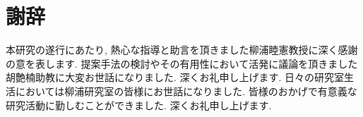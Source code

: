 \chapter*{謝辞}
本研究の遂行にあたり, 熱心な指導と助言を頂きました柳浦睦憲教授に深く感謝の意を表します.
提案手法の検討やその有用性において活発に議論を頂きました胡艶楠助教に大変お世話になりました. 深くお礼申し上げます.
日々の研究室生活においては柳浦研究室の皆様にお世話になりました.
皆様のおかげで有意義な研究活動に勤しむことができました. 深くお礼申し上げます.
